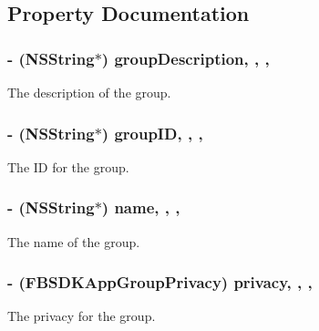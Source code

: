 \subsection{Property Documentation}
\hypertarget{interface_f_b_s_d_k_app_group_content_abb46868ac35b14093f032f25c53b8106}{
\subsubsection[{group\-Description}]{\setlength{\rightskip}{0pt plus 5cm}-\/ (N\-S\-String$\ast$) group\-Description\hspace{0.3cm}{\ttfamily [read]}, {\ttfamily [write]}, {\ttfamily [nonatomic]}, {\ttfamily [copy]}}}\label{interface_f_b_s_d_k_app_group_content_abb46868ac35b14093f032f25c53b8106}
The description of the group. \hypertarget{interface_f_b_s_d_k_app_group_content_a4caee641712b602afbffb931da99a003}{
\subsubsection[{group\-I\-D}]{\setlength{\rightskip}{0pt plus 5cm}-\/ (N\-S\-String$\ast$) group\-I\-D\hspace{0.3cm}{\ttfamily [read]}, {\ttfamily [write]}, {\ttfamily [nonatomic]}, {\ttfamily [copy]}}}\label{interface_f_b_s_d_k_app_group_content_a4caee641712b602afbffb931da99a003}
The I\-D for the group. \hypertarget{interface_f_b_s_d_k_app_group_content_a838919b863c4398e13315ec1bae8dd98}{
\subsubsection[{name}]{\setlength{\rightskip}{0pt plus 5cm}-\/ (N\-S\-String$\ast$) name\hspace{0.3cm}{\ttfamily [read]}, {\ttfamily [write]}, {\ttfamily [nonatomic]}, {\ttfamily [copy]}}}\label{interface_f_b_s_d_k_app_group_content_a838919b863c4398e13315ec1bae8dd98}
The name of the group. \hypertarget{interface_f_b_s_d_k_app_group_content_a8d405bc64a6c40dfbc5165dc524c37a7}{
\subsubsection[{privacy}]{\setlength{\rightskip}{0pt plus 5cm}-\/ (F\-B\-S\-D\-K\-App\-Group\-Privacy) privacy\hspace{0.3cm}{\ttfamily [read]}, {\ttfamily [write]}, {\ttfamily [nonatomic]}, {\ttfamily [assign]}}}\label{interface_f_b_s_d_k_app_group_content_a8d405bc64a6c40dfbc5165dc524c37a7}
The privacy for the group. 

